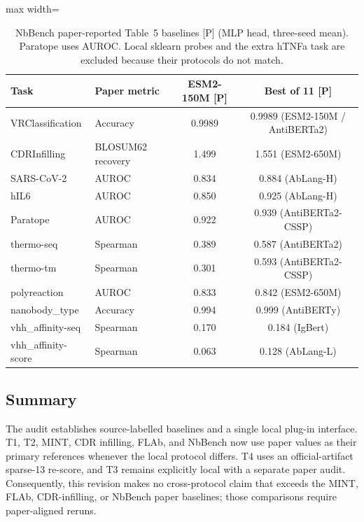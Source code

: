 \begin{table}[t]
\centering
\caption{NbBench paper-reported Table~5 baselines [P] (MLP head, three-seed
mean). Paratope uses AUROC. Local sklearn probes and the extra hTNFa task are
excluded because their protocols do not match.}
\label{tab:nbbench}
\small
\setlength{\tabcolsep}{3.5pt}
\begin{adjustbox}{max width=\textwidth}
\begin{tabular}{@{}llcc@{}}
\toprule
Task & Paper metric & ESM2-150M [P] & Best of 11 [P] \\
\midrule
VRClassification    & Accuracy & 0.9989 & 0.9989 (ESM2-150M / AntiBERTa2) \\
CDRInfilling        & BLOSUM62 recovery & 1.499 & 1.551 (ESM2-650M) \\
SARS-CoV-2          & AUROC    & 0.834 & 0.884 (AbLang-H) \\
hIL6                & AUROC    & 0.850 & 0.925 (AbLang-H) \\
Paratope            & AUROC    & 0.922 & 0.939 (AntiBERTa2-CSSP) \\
thermo-seq          & Spearman & 0.389 & 0.587 (AntiBERTa2) \\
thermo-tm           & Spearman & 0.301 & 0.593 (AntiBERTa2-CSSP) \\
polyreaction        & AUROC    & 0.833 & 0.842 (ESM2-650M) \\
nanobody\_type      & Accuracy & 0.994 & 0.999 (AntiBERTy) \\
vhh\_affinity-seq   & Spearman & 0.170 & 0.184 (IgBert) \\
vhh\_affinity-score & Spearman & 0.063 & 0.128 (AbLang-L) \\
\bottomrule
\end{tabular}
\end{adjustbox}
\end{table}

\subsection{Summary}
The audit establishes source-labelled baselines and a single local plug-in
interface. T1, T2, MINT, CDR infilling, FLAb, and NbBench now use paper values
as their primary references whenever the local protocol differs. T4 uses an
official-artifact sparse-13 re-score, and T3 remains explicitly local with a
separate paper audit. Consequently, this revision makes no cross-protocol claim
that \Ours{} exceeds the MINT, FLAb, CDR-infilling, or NbBench paper baselines;
those comparisons require paper-aligned reruns.
